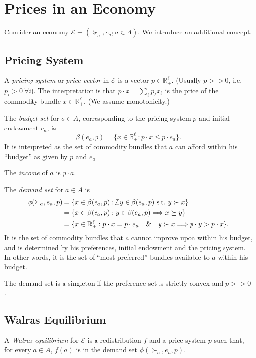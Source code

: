 \documentclass[a4paper]{amsart}
\theoremstyle{plain}
\theoremstyle{definition}
\theoremstyle{remark}
\begin{document}
\section{\textbf{Prices in an Economy}}

Consider an economy $  \mathcal{E}   = (\succeq_a, e_a; a \in A )$.  We introduce an additional concept.


\subsection{Pricing System} A \emph{pricing system} or \emph{price vector} in $  \mathcal{E}   $ is a vector $ p \in \mathbb{R} ^\ell_+  $.  (Usually $ p>>0 $, i.e.\ $ p_i>0 \ \forall i$). The interpretation
is that $ p \cdot x = \sum_\ell p_\ell x_\ell $ is the price of the commodity bundle $ x \in  \mathbb{R} ^\ell_+$.
(We assume monotonicity.)

\medskip The \emph{budget set} for $ a\in A $, corresponding to the pricing system $ p $ and initial endowment  $e_a $, is 
\[ \beta(e_a, p) = \{ x \in \mathbb{R} ^\ell_+ : p \cdot x \leq p \cdot e_a \}. \]
It is interpreted as the set of commodity bundles that $ a $ can afford within his ``budget'' as given by $ p  $ and $ e_a $.

The \emph{income} of $ a $ is $ p \cdot a $.

 The \emph{demand set} for $ a\in A $ is
\begin{align*}
\phi(\succeq_a, e_a, p) &= \{   x \in\beta(e_a, p) : \not\exists y \in  \beta(e_a, p) \text{ s.t.\ } y \succ x \}\\
&=  \{   x \in\beta(e_a, p) :  y \in  \beta(e_a, p) \Longrightarrow x \succeq y \}\\
&= \{ x \in \mathbb{R} ^\ell_+ : p \cdot x  = p \cdot e_a\quad  \& \quad   y \succ x \Longrightarrow p\cdot y > p \cdot x \}.
\end{align*} 
It is the set of commodity bundles that $ a $ cannot improve upon within his budget, and is determined by his preferences, initial endowment and the pricing system.  In other words, it is the set of ``most preferred'' bundles available to $ a $ within his budget.

The demand set is a singleton  if the preference set is strictly convex and $ p >>0 $.
\subsection{Walras Equilibrium}  A \emph{Walras equilibrium} for $ \mathcal{E}  $  is a redistribution $ f $ 
and a price system $ p $ such that, for every $ a \in A $, $ f(a) $   is in the demand set $ \phi(\succ_a, e_a, p)  $.   
\end{document}
